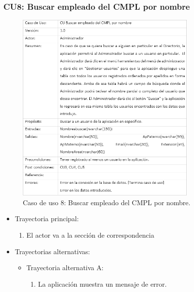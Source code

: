 		\subsubsection{CU8: Buscar empleado del CMPL por nombre}
			\begin{figure}[htbp!]
				\centering
					\includegraphics[width=0.8\textwidth]{images/CU/CU8}
					\caption{Caso de uso 8: Buscar empleado del CMPL por nombre.}
				\label{Tabla}
			\end{figure}
			
			\begin{itemize}
				\item Trayectoria principal:
					\begin{enumerate}
						\item El actor va a la sección de correspondencia 
					\end{enumerate}
				\item Trayectorias alternativas:
					\begin{itemize}
						\item Trayectoria alternativa A:
							\begin{enumerate}
								\item La aplicación muestra un mensaje de error.
							\end{enumerate}
					\end{itemize}
			\end{itemize}
			

